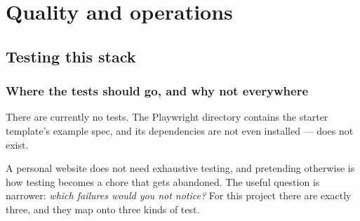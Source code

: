 \part{Quality and operations}

\chapter{Testing this stack}
\label{ch:testing}

\section{Where the tests should go, and why not everywhere}

There are currently no tests. The Playwright directory contains the starter template's example
spec, and its dependencies are not even installed ---  does not exist.

A personal website does not need exhaustive testing, and pretending otherwise is how testing
becomes a chore that gets abandoned. The useful question is narrower: \emph{which failures would
you not notice?} For this project there are exactly three, and they map onto three kinds of test.

